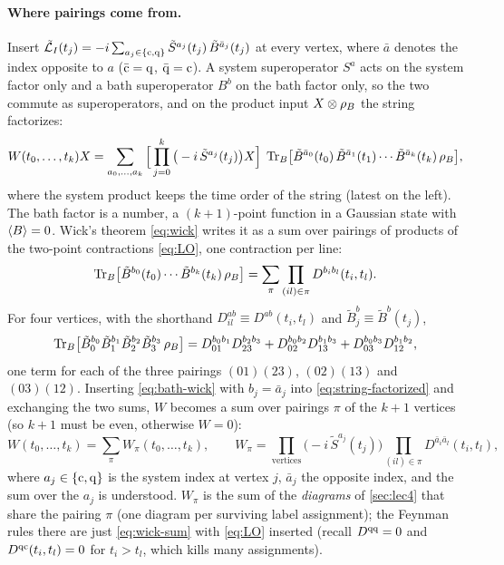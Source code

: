 \paragraph{Where pairings come from.}
Insert $\tilde{\mathcal{L}}_I(t_j)=-i\sum_{a_j\in\{\mathrm{c},\mathrm{q}\}}\tilde S^{a_j}(t_j)\,\tilde B^{\bar a_j}(t_j)$ at every vertex, where $\bar a$ denotes the index opposite to $a$ ($\bar{\mathrm{c}}=\mathrm{q}$, $\bar{\mathrm{q}}=\mathrm{c}$).
A system superoperator $S^a$ acts on the system factor only and a bath superoperator $B^b$ on the bath factor only, so the two commute as superoperators, and on the product input $X\otimes\rho_{B}$ the string factorizes:
\begin{equation}
  W(t_0,\dots,t_k)X=\sum_{a_0,\dots,a_k}\Big[\prod_{j=0}^{k}\big(-i\,\tilde S^{a_j}(t_j)\big)X\Big]\;
  \operatorname{Tr}_B\!\big[\tilde B^{\bar a_0}(t_0)\,\tilde B^{\bar a_1}(t_1)\cdots\tilde B^{\bar a_k}(t_k)\,\rho_{B}\big],
  \label{eq:string-factorized}
\end{equation}
where the system product keeps the time order of the string (latest on the left).
The bath factor is a number, a $(k+1)$-point function in a Gaussian state with $\langle B\rangle=0$.
Wick's theorem \eqref{eq:wick} writes it as a sum over pairings of products of the two-point contractions \eqref{eq:LO}, one contraction per line:
\begin{equation}
  \operatorname{Tr}_B\!\big[\tilde B^{b_0}(t_0)\cdots\tilde B^{b_k}(t_k)\,\rho_{B}\big]=\sum_\pi\prod_{(il)\in\pi}D^{b_ib_l}(t_i,t_l).
  \label{eq:bath-wick}
\end{equation}
For four vertices, with the shorthand $D^{ab}_{il}\equiv D^{ab}(t_i,t_l)$ and $\tilde B^{b}_j\equiv\tilde B^{b}(t_j)$,
\begin{equation}
  \operatorname{Tr}_B\!\big[\tilde B^{b_0}_0\tilde B^{b_1}_1\tilde B^{b_2}_2\tilde B^{b_3}_3\,\rho_{B}\big]
  =D^{b_0b_1}_{01}D^{b_2b_3}_{23}+D^{b_0b_2}_{02}D^{b_1b_3}_{13}+D^{b_0b_3}_{03}D^{b_1b_2}_{12},
  \label{eq:wick-four}
\end{equation}
one term for each of the three pairings $(01)(23)$, $(02)(13)$ and $(03)(12)$.
Inserting \cref{eq:bath-wick} with $b_j=\bar a_j$ into \cref{eq:string-factorized} and exchanging the two sums, $W$ becomes a sum over pairings $\pi$ of the $k+1$ vertices (so $k+1$ must be even, otherwise $W=0$):
\begin{equation}
  W(t_0,\dots,t_k)=\sum_{\pi}W_\pi(t_0,\dots,t_k),\qquad
  W_\pi=\prod_{\text{vertices}}\big(-i\,\tilde S^{a_j}(t_j)\big)\prod_{(il)\in\pi}D^{\bar a_i\bar a_l}(t_i,t_l),
  \label{eq:wick-sum}
\end{equation}
where $a_j\in\{\mathrm{c},\mathrm{q}\}$ is the system index at vertex $j$, $\bar a_j$ the opposite index, and the sum over the $a_j$ is understood.
$W_\pi$ is the sum of the \emph{diagrams} of \cref{sec:lec4} that share the pairing $\pi$ (one diagram per surviving label assignment); the Feynman rules there are just \cref{eq:wick-sum} with \cref{eq:LO} inserted (recall $D^{\mathrm{q}\mathrm{q}}=0$ and $D^{\mathrm{q}\mathrm{c}}(t_i,t_l)=0$ for $t_i>t_l$, which kills many assignments).

